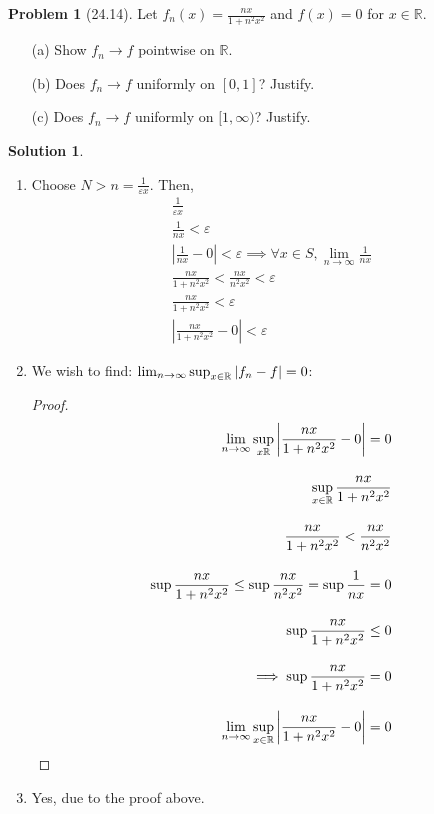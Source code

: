 \documentclass[12pt]{article}
\theoremstyle{definition} %
\newtheorem{solution}{Solution}
\newtheorem{problem}{Problem}
\theoremstyle{plain} %
\begin{document}
\begin{problem}[24.14]
    Let \( f_n(x) = \frac{nx}{1 + n^2 x^2} \) and \( f(x) = 0 \) for \( x \in \mathbb{R} \).

\begin{enumerate}
    \item[(a)] Show \( f_n \to f \) pointwise on \( \mathbb{R} \).
    \item[(b)] Does \( f_n \to f \) uniformly on \( [0, 1] \)? Justify.
    \item[(c)] Does \( f_n \to f \) uniformly on \( [1, \infty) \)? Justify.
\end{enumerate}
\end{problem}
\begin{solution}
    \begin{enumerate}
        \item Choose \(N>n=\frac{1}{\varepsilon x}\). Then,
        \begin{align}
           \frac{1}{\varepsilon x} \\[10pt] 
           \frac{1}{nx}<\varepsilon \\[10pt] 
           \left\vert \frac{1}{nx}-0 \right\vert < \varepsilon \implies \forall x\in S, \lim_{n \to \infty} \frac{1}{nx}\\[10pt] 
           \frac{nx}{1+n^{2}x^{2}}<\frac{nx}{n^{2}x^{2}}<\varepsilon \\[10pt] 
           \frac{nx}{1+n^{2}x^{2}}<\varepsilon \\[10pt] 
           \left\vert \frac{nx}{1+n^{2}x^{2}}-0 \right\vert < \varepsilon
        \end{align}
        \item We wish to find: \(\lim_{n \to \infty} \sup_{x\in\mathbb{\MakeUppercase{R}}}\left\vert f_{n}-f \right\vert =0\):
        \begin{proof}
            \begin{align}
                \lim_{n \to \infty} \sup_{x\mathbb{\MakeUppercase{r}}}\left\vert \frac{nx}{1+n^{2}x^{2}}-0 \right\vert =0 \\[10pt] 
                \sup_{x\in \mathbb{\MakeUppercase{r}}}\frac{nx}{1+n^{2}x^{2}} \\[10pt] 
                \frac{nx}{1+n^{2}x^{2}}<\frac{nx}{n^{2}x^{2}} \\[10pt] 
                \sup \frac{nx}{1+n^{2}x^{2}}\leq \sup \frac{nx}{n^{2}x^{2}} = \sup \frac{1}{nx}=0\\[10pt] 
                \sup \frac{nx}{1+n^{2}x^{2}} \leq 0 \\[10pt] 
                \implies \sup \frac{nx}{1+n^{2}x^{2}}=0 \\[10pt] 
                \lim_{n \to \infty} \sup_{x\in \mathbb{\MakeUppercase{r}} } \left\vert \frac{nx}{1+n^{2}x^{2}}-0 \right\vert =0
            \end{align} 
        \end{proof}
    \item Yes, due to the proof above.
    \end{enumerate}
\end{solution}
\end{document}
